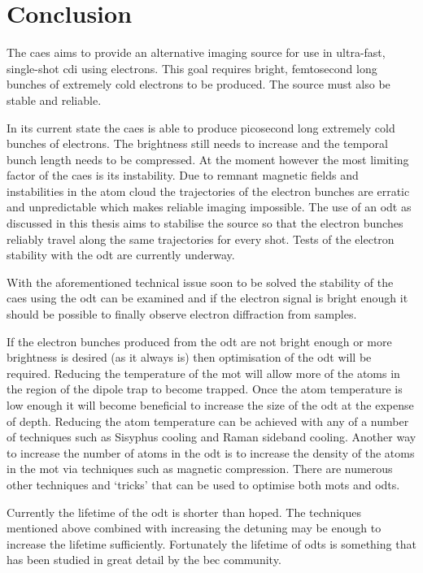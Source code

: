 \chapter{Conclusion}

The \gls{caes} aims to provide an alternative imaging source for use in ultra-fast, single-shot \gls{cdi} using electrons. This goal requires bright, femtosecond long bunches of extremely cold electrons to be produced. The source must also be stable and reliable.

In its current state the \gls{caes} is able to produce picosecond long extremely cold bunches of electrons. The brightness still needs to increase and the temporal bunch length needs to be compressed. At the moment however the most limiting factor of the \gls{caes} is its instability. Due to remnant magnetic fields and instabilities in the atom cloud the trajectories of the electron bunches are erratic and unpredictable which makes reliable imaging impossible. The use of an \gls{odt} as discussed in this thesis aims to stabilise the source so that the electron bunches reliably travel along the same trajectories for every shot. Tests of the electron stability with the \gls{odt} are currently underway.

With the aforementioned technical issue soon to be solved the stability of the \gls{caes} using the \gls{odt} can be examined and if the electron signal is bright enough it should be possible to finally observe electron diffraction from samples.

If the electron bunches produced from the \gls{odt} are not bright enough or more brightness is desired (as it always is) then optimisation of the \gls{odt} will be required. Reducing the temperature of the \gls{mot} will allow more of the atoms in the region of the dipole trap to become trapped. Once the atom temperature is low enough it will become beneficial to increase the size of the \gls{odt} at the expense of depth. Reducing the atom temperature can be achieved with any of a number of techniques such as Sisyphus cooling\cite{metcalf_laser_1999} and Raman sideband cooling\cite{lee_raman_1996, metcalf_laser_1999}. Another way to increase the number of atoms in the \gls{odt} is to increase the density of the atoms in the \gls{mot} via techniques such as magnetic compression. There are numerous other techniques and `tricks' that can be used to optimise both \glspl{mot} and \glspl{odt}\cite{kuppens_loading_2000, grimm_optical_2000}.

Currently the lifetime of the \gls{odt} is shorter than hoped. The techniques mentioned above combined with increasing the detuning may be enough to increase the lifetime sufficiently. Fortunately the lifetime of \glspl{odt} is something that has been studied in great detail by the \gls{bec} community\cite{barrett_all-optical_2001, arnold_all-optical_2011}.

